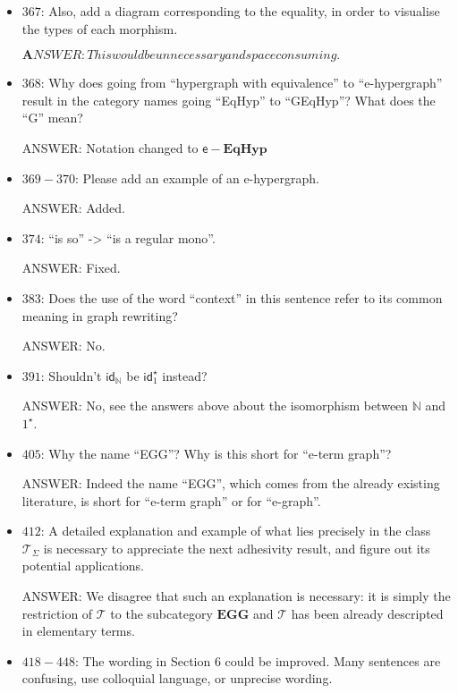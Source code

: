 \documentclass[english,11pt,a4paper]{article}
\begin{document}
\begin{itemize}
\item $367$: Also, add a diagram corresponding to the equality, in order to visualise the types of each morphism.

${\mathbf ANSWER: This would be unnecessary and space consuming.}$

\item $368$: Why does going from ``hypergraph with equivalence'' to ``e-hypergraph'' result in the category names going ``EqHyp'' to ``GEqHyp''? What does the ``G'' mean?

ANSWER: Notation changed to $\mathsf{e}-\mathbf{EqHyp}$


\item $369-370$: Please add an example of an e-hypergraph.

ANSWER: Added.

\item $374$: ``is so'' -> ``is a regular mono''.

ANSWER: Fixed.

\item $383$: Does the use of the word ``context'' in this sentence refer to its common meaning in graph rewriting?

ANSWER: No.

\item $391$: Shouldn't $\mathsf{id}_\mathbb{N}$ be $\mathsf{id}^\star_1$ instead? 

ANSWER: No, see the answers above about the isomorphism between $\mathbb{N}$ and $1^\star$.

\item $405$: Why the name ``EGG''? Why is this short for ``e-term graph''?

ANSWER: Indeed the name ``EGG'', which comes from the already existing literature, is short for ``e-term graph'' or for ``e-graph''.

\item $412$: A detailed explanation and example of what lies precisely in the class $\mathcal{T}_\Sigma$ is necessary to appreciate the next adhesivity result, and figure out its potential applications.

ANSWER: We disagree that such an explanation is necessary: it is simply the restriction of $\mathcal{T}$ to the subcategory $\mathbf{EGG}$ and $\mathcal{T}$ has been already descripted in elementary terms.

\item $418-448$: The wording in Section 6 could be improved. Many sentences are confusing, use colloquial language, or unprecise wording.


\end{itemize}
\end{document}
